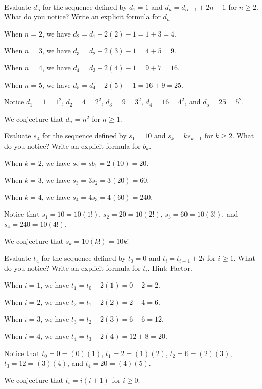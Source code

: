 \begin{exam}
\label{exam_eval_rec_def_seq_involving_index}
~
    \begin{apart}
        \item Evaluate $d_5$ for the sequence defined by $d_1 = 1$ and $d_n=d_{n-1}+2n-1$ for $n\ge 2$. What do you notice?  Write an explicit formula for $d_n$.
            \begin{soln}
                When $n=2$, we have $d_2=d_1+2(2)-1=1+3=4$. 
                
                When $n=3$, we have $d_3=d_2+2(3)-1=4+5=9.$
                
                When $n=4$, we have $d_4=d_3+2(4)-1=9+7=16.$
                
                When $n=5$, we have $d_5=d_4+2(5)-1=16+9 = 25.$

                Notice $d_1=1 = 1^2$, $d_2=4=2^2$, $d_3=9=3^2$, $d_4=16=4^2$, and $d_5=25=5^2$.  
                
                We conjecture that $d_n=n^2$ for $n \ge 1$.
            \end{soln}
        \item Evaluate $s_4$ for the sequence defined by $s_1=10$ and $s_k=ks_{k-1}$ for $k \ge 2$.  What do you notice? Write an explicit formula for $b_k$.
            \begin{soln}
                When $k=2$, we have $s_2=sb_1 = 2(10) = 20$.
                
                When $k=3$, we have $s_3=3s_2 = 3(20) = 60$.
                
                When $k=4$, we have $s_4=4s_3 = 4(60) = 240$.

                Notice that $s_1=10=10(1!)$, $s_2=20=10(2!)$, 
                $s_3=60=10(3!)$,
                and $s_4=240=10(4!)$.  

                We conjecture that $s_k=10(k!)=10k!$
            \end{soln}
            \item Evaluate $t_4$ for the sequence defined by $t_0=0$ and $t_i=t_{i-1}+2i$ for $i \ge 1$. What do you notice?  Write an explicit formula for $t_i$. Hint: Factor.
                \begin{soln}
                    When $i=1$, we have $t_1=t_0+2(1) = 0+2=2$.

                    When $i=2$, we have $t_2=t_1+2(2) = 2+4=6$.

                    When $i=3$, we have $t_3=t_2+2(3) = 6+6=12$.

                    When $i=4$, we have $t_4=t_3+2(4) = 12+8=20$.

                    Notice that $t_0=0=(0)(1)$, $t_1=2=(1)(2)$, $t_2=6=(2)(3)$, $t_3=12=(3)(4)$,  and $t_4=20=(4)(5)$.  

                    We conjecture that $t_i=i(i+1)$ for $i \ge 0$.
                \end{soln}
    \end{apart}
\end{exam}
        
